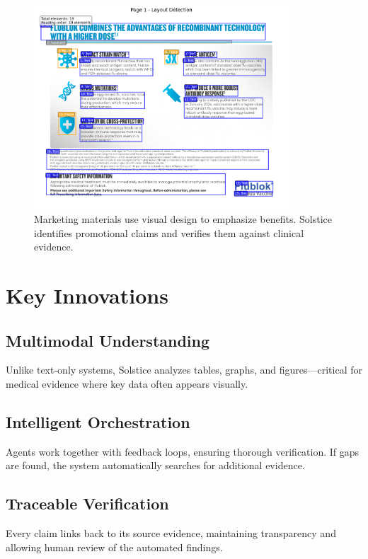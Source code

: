 \documentclass[11pt]{article}
\begin{document}
\begin{figure}[htbp]
\centering
\includegraphics[width=0.85\textwidth]{marketing_layout_example.png}
\caption{Marketing materials use visual design to emphasize benefits. Solstice identifies promotional claims and verifies them against clinical evidence.}
\end{figure}

\section{Key Innovations}

\subsection{Multimodal Understanding}
Unlike text-only systems, Solstice analyzes tables, graphs, and figures—critical for medical evidence where key data often appears visually.

\subsection{Intelligent Orchestration}
Agents work together with feedback loops, ensuring thorough verification. If gaps are found, the system automatically searches for additional evidence.

\subsection{Traceable Verification}
Every claim links back to its source evidence, maintaining transparency and allowing human review of the automated findings.
\end{document}
